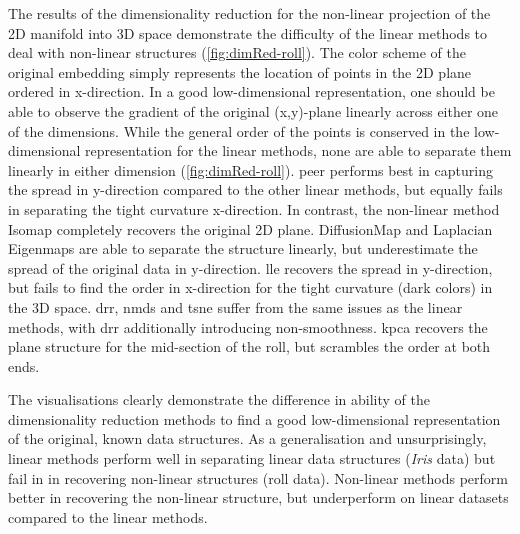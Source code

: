 The results of the dimensionality reduction for the non-linear projection of the 2D manifold into 3D space demonstrate the difficulty of the linear methods to deal with non-linear structures (\cref{fig:dimRed-roll}). The color scheme of the original embedding simply represents the location of points in the 2D plane ordered in x-direction. In a good low-dimensional representation, one should be able to observe the gradient of the original (x,y)-plane linearly across either one of the dimensions. While the general order of the points is conserved in the low-dimensional representation for the linear methods, none are able to separate them linearly in either dimension (\cref{fig:dimRed-roll}). \gls{peer} performs best in capturing the spread in y-direction compared to the other linear methods, but equally fails in separating the tight curvature x-direction. In contrast, the non-linear method Isomap completely recovers the original 2D plane. DiffusionMap and Laplacian Eigenmaps are able to separate the structure linearly, but underestimate the spread of the original data in y-direction. \gls{lle} recovers the spread in y-direction, but fails to find the order in x-direction for the tight curvature (dark colors) in the 3D space. \gls{drr}, \gls{nmds} and \gls{tsne} suffer from the same issues as the linear methods, with \gls{drr} additionally introducing non-smoothness. \gls{kpca} recovers the plane structure for the mid-section of the roll, but scrambles the order at both ends. 

The visualisations clearly demonstrate the difference in ability of the dimensionality reduction methods to find a good low-dimensional representation of the original, known data structures. As a generalisation and unsurprisingly, linear methods perform well in separating linear data structures (\textit{Iris} data) but fail in in recovering non-linear structures (roll data). Non-linear methods perform better in recovering the non-linear structure, but underperform on linear datasets compared to the linear methods. 

